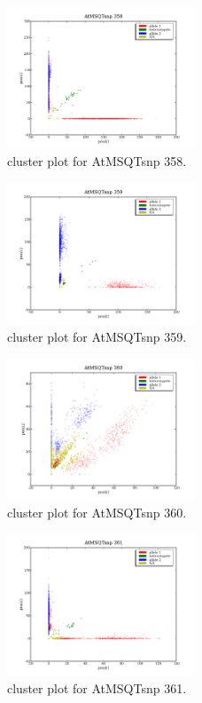 \begin{figure}[H]
\includegraphics[width=0.5\textwidth]{figures/cluster_plot_AtMSQTsnp_358.png}
\caption{cluster plot for AtMSQTsnp 358.} \label{flAtMSQTsnp358}
\end{figure}

\begin{figure}[H]
\includegraphics[width=0.5\textwidth]{figures/cluster_plot_AtMSQTsnp_359.png}
\caption{cluster plot for AtMSQTsnp 359.} \label{flAtMSQTsnp359}
\end{figure}

\begin{figure}[H]
\includegraphics[width=0.5\textwidth]{figures/cluster_plot_AtMSQTsnp_360.png}
\caption{cluster plot for AtMSQTsnp 360.} \label{flAtMSQTsnp360}
\end{figure}

\begin{figure}[H]
\includegraphics[width=0.5\textwidth]{figures/cluster_plot_AtMSQTsnp_361.png}
\caption{cluster plot for AtMSQTsnp 361.} \label{flAtMSQTsnp361}
\end{figure}

